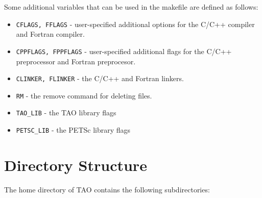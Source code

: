Some additional variables that can be used in the makefile are defined
as follows:
\begin{itemize}
\item \texttt{CFLAGS, FFLAGS} - user-specified additional options for the
  C/C++ compiler and Fortran compiler.
\item \texttt{CPPFLAGS, FPPFLAGS} - user-specified additional flags
        for the C/C++ preprocessor and Fortran preprocesor.
\item \texttt{CLINKER, FLINKER} - the C/C++ and Fortran linkers. 
\item \texttt{RM} - the remove command for deleting files.
\item \texttt{TAO\_LIB} - the TAO library flags
\item \texttt{PETSC\_LIB} - the PETSc library flags

\end{itemize}

\section{Directory Structure}

The home directory of TAO contains the following subdirectories:

